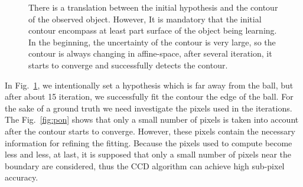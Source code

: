 \begin{figure}[htbp]
  \begin{minipage}[t]{0.5\linewidth} 
    \centering 
  \end{minipage} 
\caption[Segmentation of a ball]{There is a translation between the
  initial hypothesis and the contour of the observed object. However, It is
  mandatory that the initial contour encompass at least part surface
  of the object being learning. In the beginning, the uncertainty of
  the contour is very large, so the contour is always changing in
  affine-space, after several iteration, it starts to converge and
  successfully detects the contour.
\label{fig:sab}
}
\end{figure}

In Fig.~\ref{fig:sab}, we intentionally set a hypothesis which is far away
from the ball, but after about 15 iteration, we successfully fit the
contour the edge of the ball. For the sake of a ground truth we need
investigate the pixels used in the iterations. The Fig.~\ref{fig:pon} shows
that only a small number of pixels is taken into account after the
contour starts to converge. However, these pixels contain the
necessary information for refining the fitting. Because the pixels used
to compute become less and less, at last, it is supposed that
only a small number of pixels near the boundary are considered, thus the
CCD algorithm can achieve high sub-pixel accuracy.

